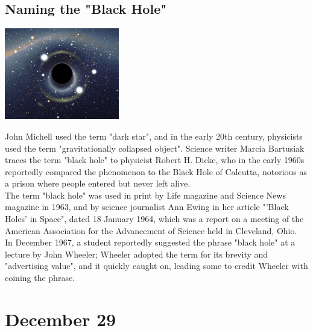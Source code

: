 \documentclass[11pt]{report}
\begin{document}
\subsection{Naming the "Black Hole"}
\vspace{2mm}\begin{center}\includegraphics[width=5cm]{./img/blackHole.jpg}\end{center}
John Michell used the term "dark star", and in the early 20th century, physicists used the term "gravitationally collapsed object". Science writer Marcia Bartusiak traces the term "black hole" to physicist Robert H. Dicke, who in the early 1960s reportedly compared the phenomenon to the Black Hole of Calcutta, notorious as a prison where people entered but never left alive.\\
\indent The term "black hole" was used in print by Life magazine and Science News magazine in 1963, and by science journalist Ann Ewing in her article "'Black Holes' in Space", dated 18 January 1964, which was a report on a meeting of the American Association for the Advancement of Science held in Cleveland, Ohio.\\
\indent In December 1967, a student reportedly suggested the phrase "black hole" at a lecture by John Wheeler; Wheeler adopted the term for its brevity and "advertising value", and it quickly caught on, leading some to credit Wheeler with coining the phrase.
\section{December 29}
\end{document}
